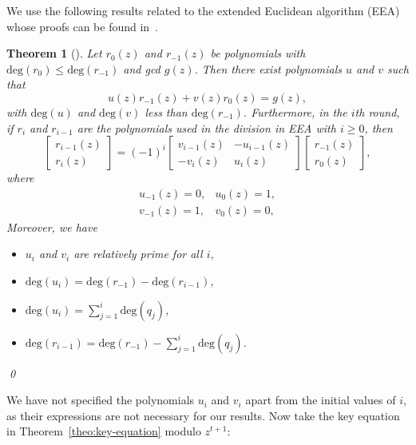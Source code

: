 \documentclass[pdflatex,sn-mathphys-num]{sn-jnl}
\newtheorem{theorem}{Theorem}
\theoremstyle{definition}
\begin{document}
We use the following results related to the extended Euclidean algorithm (EEA) whose proofs can be found in~\cite[\S 12.8]{toecc-book}.

\begin{theorem}[\cite{toecc-book}]
\label{the:eea}
Let $r_{0}(z)$ and $r_{-1}(z)$ be polynomials with $\text{deg}(r_{0}) \leq \text{deg}(r_{-1})$ and gcd $g(z)$. Then there exist polynomials $u$ and $v$ such that
\begin{equation}
\label{eq:gcd}
u(z) r_{-1}(z) + v(z) r_{0}(z) = g(z),    
\end{equation}
with $\text{deg}(u)$ and $\text{deg}(v)$ less than $\text{deg}(r_{-1})$. Furthermore, in the $i$th round, if $r_i$ and $r_{i-1}$ are the polynomials used in the division in EEA with $i \geq 0$, then
\begin{equation}
\label{eq:eea}
    \begin{bmatrix}
    r_{i-1}(z) \\ r_{i}(z)
    \end{bmatrix}
    = (-1)^i \begin{bmatrix}
    v_{i-1}(z) & -u_{i-1}(z) \\
    - v_i (z) & u_i (z) 
     \end{bmatrix}
     \begin{bmatrix}
         r_{-1}(z) \\ r_{0}(z)
     \end{bmatrix},
\end{equation}
where
\[
\begin{matrix}
    u_{-1}(z) = 0, & u_{0}(z) = 1, \\
    v_{-1}(z) = 1,  & v_{0}(z) = 0,
\end{matrix}
\]
Moreover, we have 
\begin{itemize}
    \item $u_i$ and $v_i$ are relatively prime for all $i$,
    \item $\text{deg}(u_i) = \text{deg}(r_{-1}) - \text{deg}(r_{i-1})$,
    \item $\text{deg}(u_i) = \sum_{j = 1}^{i} \text{deg}(q_{j}) $,
    \item $\text{deg}(r_{i-1}) = \text{deg}(r_{-1}) - \sum_{j = 1}^{i} \text{deg}(q_{j})$.
\end{itemize}
\qed
\end{theorem}
We have not specified the polynomials $u_i$ and $v_i$ apart from the initial values of $i$, as their expressions are not necessary for our results. Now take the key equation in Theorem~\ref{theo:key-equation} modulo $z^{t+1}$:
\end{document}
